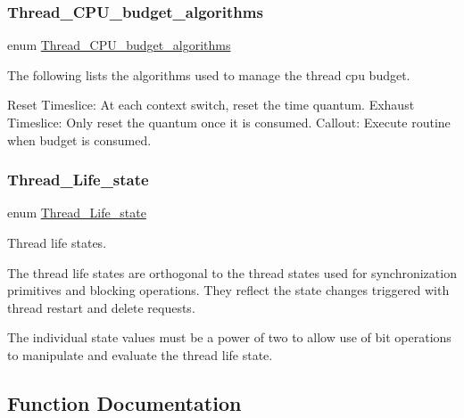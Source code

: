 \subsubsection{\texorpdfstring{Thread\_CPU\_budget\_algorithms}{Thread\_CPU\_budget\_algorithms}}
{\footnotesize\ttfamily enum \mbox{\hyperlink{group__RTEMSScoreThread_gab6f48556812ffc781a69df144ef49be0}{Thread\+\_\+\+C\+P\+U\+\_\+budget\+\_\+algorithms}}}

The following lists the algorithms used to manage the thread cpu budget.

Reset Timeslice\+: At each context switch, reset the time quantum. Exhaust Timeslice\+: Only reset the quantum once it is consumed. Callout\+: Execute routine when budget is consumed. \mbox{\label{group__RTEMSScoreThread_ga0b4c61e432a0c21855e3122bb394583d}} 
\subsubsection{\texorpdfstring{Thread\_Life\_state}{Thread\_Life\_state}}
{\footnotesize\ttfamily enum \mbox{\hyperlink{group__RTEMSScoreThread_ga0b4c61e432a0c21855e3122bb394583d}{Thread\+\_\+\+Life\+\_\+state}}}



Thread life states. 

The thread life states are orthogonal to the thread states used for synchronization primitives and blocking operations. They reflect the state changes triggered with thread restart and delete requests.

The individual state values must be a power of two to allow use of bit operations to manipulate and evaluate the thread life state. 

\subsection{Function Documentation}
\mbox{\label{group__RTEMSScoreThread_ga6c6a5ea33a2380faf75952592f7ff8f0}} 
